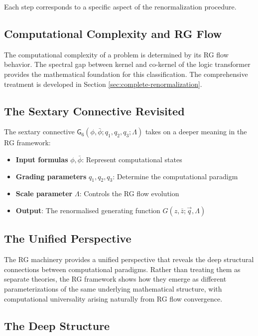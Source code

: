 Each step corresponds to a specific aspect of the renormalization procedure.

\subsection{Computational Complexity and RG Flow}

The computational complexity of a problem is determined by its RG flow behavior. The spectral gap between kernel and co-kernel of the logic transformer provides the mathematical foundation for this classification. The comprehensive treatment is developed in Section \ref{sec:complete-renormalization}.

\subsection{The Sextary Connective Revisited}

\begin{definition}
\label{def:sextary-rg}
The sextary connective $\mathsf{G}_6(\phi, \bar{\phi}; q_1, q_2, q_3; \Lambda)$ takes on a deeper meaning in the RG framework:

\begin{itemize}
\item \textbf{Input formulas} $\phi, \bar{\phi}$: Represent computational states
\item \textbf{Grading parameters} $q_1, q_2, q_3$: Determine the computational paradigm
\item \textbf{Scale parameter} $\Lambda$: Controls the RG flow evolution
\item \textbf{Output}: The renormalised generating function $G(z, \bar{z}; \vec{q}, \Lambda)$
\end{itemize}
\end{definition}

\subsection{The Unified Perspective}

The RG machinery provides a unified perspective that reveals the deep structural connections between computational paradigms. Rather than treating them as separate theories, the RG framework shows how they emerge as different parameterizations of the same underlying mathematical structure, with computational universality arising naturally from RG flow convergence.

\subsection{The Deep Structure}

